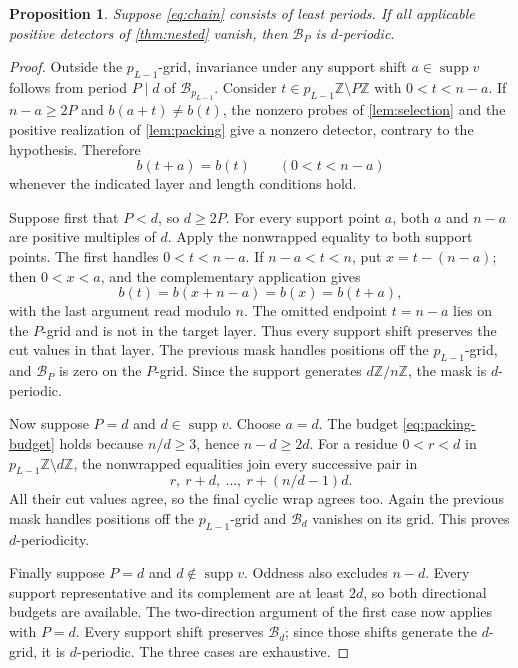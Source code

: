 \documentclass[11pt,a4paper]{amsart}
\numberwithin{equation}{section}
\theoremstyle{plain}
\newtheorem{proposition}[theorem]{Proposition}
\theoremstyle{definition}
\newcommand{\Z}{\mathbb Z}
\newcommand{\supp}{\operatorname{supp}}
\begin{document}
\begin{proposition}\label{prop:propagation}
Suppose \eqref{eq:chain} consists of least periods.  If all applicable
positive detectors of \cref{thm:nested} vanish, then \(\mathcal B_P\) is
\(d\)-periodic.
\end{proposition}
\begin{proof}
Outside the \(p_{L-1}\)-grid, invariance under any support shift
\(a\in\supp v\) follows from period \(P\mid d\) of
\(\mathcal B_{p_{L-1}}\).  Consider
\(t\in p_{L-1}\Z\setminus P\Z\) with \(0<t<n-a\).
If \(n-a\ge2P\) and \(b(a+t)\ne b(t)\), the nonzero probes of
\cref{lem:selection} and the positive realization of \cref{lem:packing}
give a nonzero detector, contrary to the hypothesis.  Therefore
\[
b(t+a)=b(t)\qquad(0<t<n-a)
\]
whenever the indicated layer and length conditions hold.

Suppose first that \(P<d\), so \(d\ge2P\).  For every support point
\(a\), both \(a\) and \(n-a\) are positive multiples of \(d\).
Apply the nonwrapped equality to both support points.  The first handles
\(0<t<n-a\).  If \(n-a<t<n\), put \(x=t-(n-a)\); then
\(0<x<a\), and the complementary application gives
\[
b(t)=b(x+n-a)=b(x)=b(t+a),
\]
with the last argument read modulo \(n\).  The omitted endpoint
\(t=n-a\) lies on the \(P\)-grid and is not in the target layer.
Thus every support shift preserves the cut values in that layer.  The
previous mask handles positions off the \(p_{L-1}\)-grid, and
\(\mathcal B_P\) is zero on the \(P\)-grid.  Since the support generates
\(d\Z/n\Z\), the mask is \(d\)-periodic.

Now suppose \(P=d\) and \(d\in\supp v\).  Choose \(a=d\).
The budget \eqref{eq:packing-budget} holds because \(n/d\ge3\), hence \(n-d\ge2d\).
For a residue \(0<r<d\) in
\(p_{L-1}\Z\setminus d\Z\), the nonwrapped equalities join every
successive pair in
\[
r,\ r+d,\ \ldots,\ r+(n/d-1)d.
\]
All their cut values agree, so the final cyclic wrap agrees too.
Again the previous mask handles positions off the \(p_{L-1}\)-grid
and \(\mathcal B_d\) vanishes on its grid.  This proves \(d\)-periodicity.

Finally suppose \(P=d\) and \(d\notin\supp v\).  Oddness also
excludes \(n-d\).  Every support representative and its complement
are at least \(2d\), so both directional budgets are available.
The two-direction argument of the first case now applies with \(P=d\).
Every support shift preserves \(\mathcal B_d\); since those shifts generate the
\(d\)-grid, it is \(d\)-periodic.  The three cases are exhaustive.
\end{proof}
\end{document}
